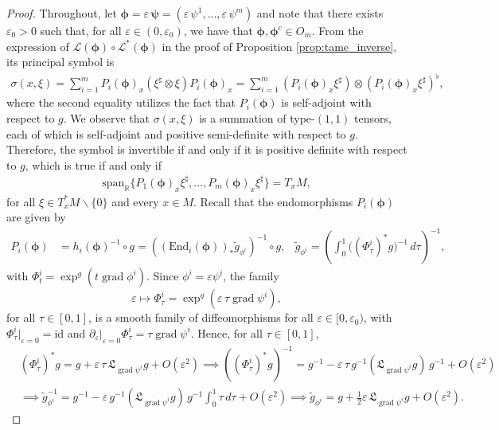 \documentclass{article}
\theoremstyle{remark}
\newcommand{\M}{M}
\DeclareMathOperator{\grad}{\mathrm{grad}}
\begin{document}
\begin{proof}
%
Throughout, let $\bm{\phi} = \varepsilon\, \bm{\psi} = (\varepsilon \,\psi^1,\dots,\varepsilon \,\psi^m)$ and note that there exists $\varepsilon_0>0$ such that, for all $\varepsilon\in(0,\varepsilon_0)$, we have that $\bm{\phi},\bm{\phi}^c\in O_m$.
%
From the expression of $\mathcal{L}(\bm{\phi})\circ\mathcal{L}^*(\bm{\phi})$ in the proof of Proposition \ref{prop:tame_inverse}, its principal symbol is
%
\begin{align*}
    \sigma(x,\xi) = \sum_{i=1}^m P_i(\bm{\phi})_x(\xi^\sharp \otimes \xi)P_i(\bm{\phi})_x = \sum_{i=1}^m (P_i(\bm{\phi})_x\xi^\sharp) \otimes (P_i(\bm{\phi})_x\xi^\sharp)^\flat,
\end{align*}
%
where the second equality utilizes the fact that $P_i(\bm{\phi})$ is self-adjoint with respect to $g$.
%
We observe that $\sigma(x,\xi)$ is a summation of type-$(1,1)$ tensors, each of which is self-adjoint and positive semi-definite with respect to $g$. Therefore, the symbol is invertible if and only if it is positive definite with respect to $g$, which is true if and only if 
%
\begin{align*}
    \mathrm{span}_{\mathbb{R}}\{P_1(\bm{\phi})_x\xi^\sharp,\dots,P_m(\bm{\phi})_x\xi^\sharp\} = T_x\M,
\end{align*}
%
for all $\xi\in T^*_x\M\backslash\{0\}$ and every $x\in\M$. Recall that the endomorphisms $P_i(\bm{\phi})$ are given by
%
\begin{align*}
    P_i(\bm{\phi}) &= h_i(\bm{\phi})^{-1}\circ g = \left((\mathrm{End}_{i}(\bm{\phi}))_*\tilde{g}_{\phi^i}\right)^{-1} \circ g, & \tilde{g}_{\phi^i}= \left(\int_0^1 \big((\Phi^i_\tau)^*g\big)^{-1}\,d\tau\right)^{-1},
\end{align*}
%
with $\Phi^i_t = \exp^g(t \grad \phi^i)$.
%
Since $\phi^i = \varepsilon\psi^i$, the family
%
$$
\varepsilon\mapsto\Phi^{i}_\tau = \exp^g(\varepsilon\,\tau\grad\psi^i),
$$
%
for all $\tau\in[0,1]$, is a smooth family of diffeomorphisms for all $\varepsilon\in[0,\varepsilon_0)$,  with $\Phi^i_\tau|_{\varepsilon=0}=\mathrm{id}$ and
$\partial_\varepsilon\big|_{\varepsilon=0}\Phi^i_\tau=\tau\grad\psi^i$.
Hence, for all $\tau\in[0,1]$,
%
\begin{align*}
    &(\Phi^i_\tau)^*g= g + \varepsilon \,\tau \,\mathfrak{L}_{\grad \psi^i} g + O(\varepsilon^2) 
    \implies((\Phi^i_\tau)^*g)^{-1}= g^{-1} - \varepsilon\,\tau\,g^{-1}(\mathfrak{L}_{\grad \psi^i} g)\, g^{-1} + O(\varepsilon^2)\\  &\implies \tilde{g}_{\phi^i}^{-1} = g^{-1} - \varepsilon\,g^{-1}(\mathfrak{L}_{\grad \psi^i} g)\, g^{-1}{\textstyle\int_0^1}\tau\,d\tau + O(\varepsilon^2)\implies \tilde{g}_{\phi^i}= g + \frac{1}{2}\varepsilon \,\mathfrak{L}_{\grad \psi^i} g + O(\varepsilon^2).

\end{align*}
\end{proof}
\end{document}
